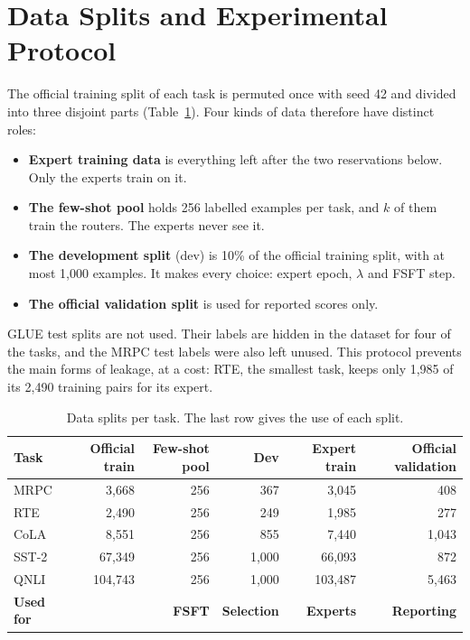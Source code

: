 \section{Data Splits and Experimental Protocol}
\label{sec:protocol}

The official training split of each task is permuted once with seed 42 and divided into three disjoint parts (Table~\ref{tab:split}). Four kinds of data therefore have distinct roles:

\begin{itemize}
  \item \textbf{Expert training data} is everything left after the two reservations below. Only the experts train on it.
  \item \textbf{The few-shot pool} holds 256 labelled examples per task, and $k$ of them train the routers. The experts never see it.
  \item \textbf{The development split} (dev) is 10\% of the official training split, with at most 1,000 examples. It makes every choice: expert epoch, $\lambda$ and FSFT step.
  \item \textbf{The official validation split} is used for reported scores only.
\end{itemize}

GLUE test splits are not used. Their labels are hidden in the dataset for four of the tasks, and the MRPC test labels were also left unused. This protocol prevents the main forms of leakage, at a cost: RTE, the smallest task, keeps only 1,985 of its 2,490 training pairs for its expert.

\begin{table}[htbp]
  \centering\tablestyle
  \caption{Data splits per task. The last row gives the use of each split.}
  \label{tab:split}
  \begin{tabular}{l r r r r r}
    \toprule
    Task & Official train & Few-shot pool & Dev & Expert train & Official validation\\
    \midrule
    MRPC & 3,668 & 256 & 367 & 3,045 & 408\\
    RTE & 2,490 & 256 & 249 & 1,985 & 277\\
    CoLA & 8,551 & 256 & 855 & 7,440 & 1,043\\
    SST-2 & 67,349 & 256 & 1,000 & 66,093 & 872\\
    QNLI & 104,743 & 256 & 1,000 & 103,487 & 5,463\\
    \midrule
    \textbf{Used for} & & \textbf{FSFT} & \textbf{Selection} & \textbf{Experts} & \textbf{Reporting}\\
    \bottomrule
  \end{tabular}
\end{table}

